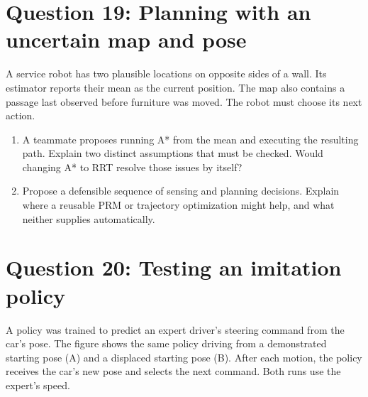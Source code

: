 \documentclass[11pt]{article}
\newenvironment{studentanswer}[1]
  {\par\medskip\noindent
   \begin{tcolorbox}[height from=#1 to 100cm, colback=white, colframe=gray!60,
     boxrule=0.6pt, arc=0pt, outer arc=0pt, left=7pt, right=7pt,
     top=7pt, bottom=7pt, title={Answer / work}, fonttitle=\small,
     coltitle=black, colbacktitle=gray!8, titlerule=0pt]
   \ignorespaces}
  {\end{tcolorbox}\par}
\begin{document}
\section*{Question 19: Planning with an uncertain map and pose}
A service robot has two plausible locations on opposite sides of a
wall. Its estimator reports their mean as the current position. The map
also contains a passage last observed before furniture was moved.
The robot must choose its next action.
\begin{enumerate}[label=(\alph*)]
\item \begin{minipage}[t]{\linewidth} A teammate proposes running A* from the mean and executing the
resulting path. Explain two distinct assumptions that must be checked.
Would changing A* to RRT resolve those issues by itself?

\begin{studentanswer}{4cm}
\end{studentanswer}

\end{minipage}

\item \begin{minipage}[t]{\linewidth} Propose a defensible sequence of sensing and planning decisions.
Explain where a reusable PRM or trajectory optimization might help,
and what neither supplies automatically.

\begin{studentanswer}{4.5cm}
\end{studentanswer}

\end{minipage}

\end{enumerate}

\clearpage
\section*{Question 20: Testing an imitation policy}
A policy was trained to predict an expert driver's steering command from
the car's pose. The figure shows the same policy driving from a
demonstrated starting pose (A) and a displaced starting pose (B).
After each motion, the policy receives the car's new pose and selects
the next command. Both runs use the expert's speed.
\end{document}

